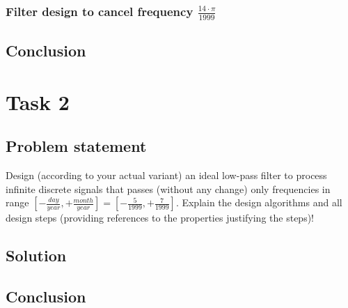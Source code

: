 \documentclass[a4paper]{article}
\theoremstyle{break}
\theoremstyle{break}
\begin{document}

\subsubsection*{Filter design to cancel frequency $\frac{14 \cdot \pi}{1999}$}


\subsection*{Conclusion}


\clearpage %
\section{Task 2}

\subsection*{Problem statement}

Design (according to your actual variant) an ideal low-pass filter to process infinite discrete signals that passes (without any change) only frequencies in range $\left[ -\frac{day}{year}, + \frac{month}{year} \right] = \left[ -\frac{5}{1999}, + \frac{7}{1999} \right]$. Explain the design algorithms and all design steps (providing references to the properties justifying the steps)!

\subsection*{Solution}


\subsection*{Conclusion}

\end{document}
